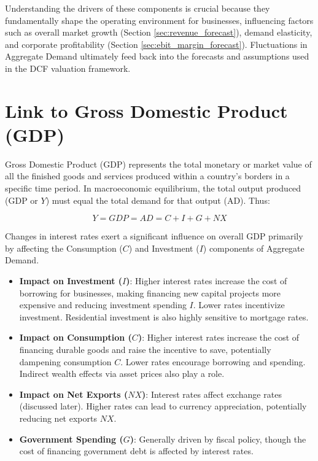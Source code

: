 Understanding the drivers of these components is crucial because they fundamentally shape the operating environment for businesses, influencing factors such as overall market growth (Section \ref{sec:revenue_forecast}), demand elasticity, and corporate profitability (Section \ref{sec:ebit_margin_forecast}). Fluctuations in Aggregate Demand ultimately feed back into the forecasts and assumptions used in the DCF valuation framework.

\section{Link to Gross Domestic Product (GDP)} \label{sec:link_to_gdp}

Gross Domestic Product (GDP) represents the total monetary or market value of all the finished goods and services produced within a country's borders in a specific time period. In macroeconomic equilibrium, the total output produced (GDP or \(Y\)) must equal the total demand for that output (AD). Thus:

\begin{equation} \label{eq:gdp_equals_ad}
    Y = GDP = AD = C + I + G + NX
\end{equation}

Changes in interest rates exert a significant influence on overall GDP primarily by affecting the Consumption (\(C\)) and Investment (\(I\)) components of Aggregate Demand.

\begin{itemize}
    \item \textbf{Impact on Investment (\(I\))}: Higher interest rates increase the cost of borrowing for businesses, making financing new capital projects more expensive and reducing investment spending \(I\). Lower rates incentivize investment. Residential investment is also highly sensitive to mortgage rates.
    \item \textbf{Impact on Consumption (\(C\))}: Higher interest rates increase the cost of financing durable goods and raise the incentive to save, potentially dampening consumption \(C\). Lower rates encourage borrowing and spending. Indirect wealth effects via asset prices also play a role.
    \item \textbf{Impact on Net Exports (\(NX\))}: Interest rates affect exchange rates (discussed later). Higher rates can lead to currency appreciation, potentially reducing net exports \(NX\).
    \item \textbf{Government Spending (\(G\))}: Generally driven by fiscal policy, though the cost of financing government debt is affected by interest rates.
\end{itemize}


